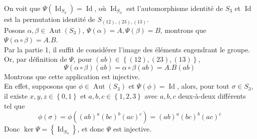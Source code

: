 \documentclass[11pt, a4paper, twoside]{article}
\DeclareMathOperator*{\aut}{Aut}
\DeclareMathOperator*{\id}{Id}
\begin{document}
On voit que $\Psi( \id_{S_3} )= \id$, où $\id_{S_3} $ est l'automorphisme identité de $S_3$ et $\id$ est la permutation identité de $S_{( 12) ,( 23) , ( 13) } $.\\
Posons $\alpha,\beta\in \aut( S_3) $, $\Psi( \alpha) = A, \Psi( \beta) = B$, montrons que $\Psi( \alpha\circ \beta) = A.B$.\\
Par la partie 1, il suffit de considérer l'image des éléments engendrant le groupe.\\
Or, par définition de $\Psi$, pour $( ab) \in \left\{ ( 12) , ( 23) ,( 13)  \right\} $, \[\Psi(\alpha\circ\beta)( ab) = \alpha\circ\beta( ab) = A.B( ab)   \]
Montrons que cette application est injective.\\
En effet, supposons que $\phi\in \aut( S_3) $ et $\Psi( \phi) = \id$, alors, pour tout $\sigma\in S_3$, il existe $x,y,z \in \left\{ 0,1 \right\} $ et $a,b,c \in \left\{ 1,2,3 \right\} $ avec $a,b,c$ deux-à-deux différents tel que
\[ 
\phi( \sigma) = \phi( ( ab)^{a}( bc) ^{b} ( ac) ^{c} ) = ( ab) ^{a} ( bc)^{b} ( ac) ^{c}	
\]
Donc $\ker \Psi = \left\{  \id_{S_3}\right\}$, et donc $\Psi$ est injective.
\end{document}
